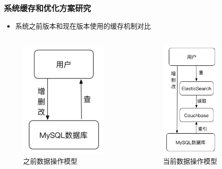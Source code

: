 \documentclass{beamer}
\begin{document}
\begin{frame}
\frametitle{系统缓存和优化方案研究}
  \begin{itemize}
    \item 系统之前版本和现在版本使用的缓存机制对比
  \end{itemize} 
  \begin{columns}
    \begin{column}{0.50\textwidth}
      \begin{figure}
        \centering
          \includegraphics[height=6cm]{./img/couchbase1.png}
        \caption{之前数据操作模型}
        \label{fig:visual}
      \end{figure}
    \end{column}
    \begin{column}{0.50\textwidth}
      \begin{figure}
        \centering
          \includegraphics[height=6cm]{./img/couchbase2.png}
        \caption{当前数据操作模型}
        \label{fig:visual}
      \end{figure}
    \end{column}
  \end{columns}
\end{frame}
\end{document}

